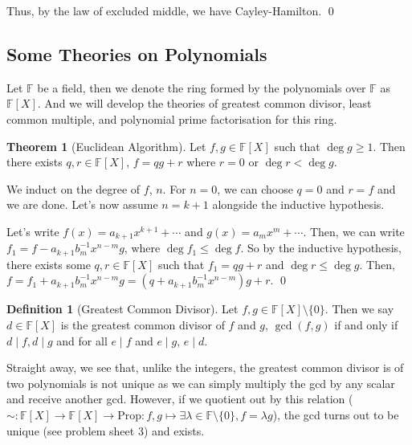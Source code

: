 \documentclass[
]{article}
\theoremstyle{definition}
\newtheorem{theorem}{Theorem}
\theoremstyle{definition}
\newtheorem{definition}{Definition}[section]
\begin{document}
Thus, by the law of excluded middle, we have Cayley-Hamilton. \qed

\hypertarget{some-theories-on-polynomials}{%
\subsection{Some Theories on
Polynomials}\label{some-theories-on-polynomials}}

Let \(\mathbb{F}\) be a field, then we denote the ring formed by the
polynomials over \(\mathbb{F}\) as \(\mathbb{F}[X]\). And we will
develop the theories of greatest common divisor, least common multiple,
and polynomial prime factorisation for this ring.

\begin{theorem}[Euclidean Algorithm]
  Let \(f, g \in \mathbb{F}[X]\) such that \(\deg g \ge 1\). Then there 
  exists \(q, r \in \mathbb{F}[X]\), \(f = q g + r\) where \(r = 0\) or 
  \(\deg r < \deg g\).
\end{theorem}
\proof

We induct on the degree of \(f\), \(n\). For \(n = 0\), we can choose
\(q = 0\) and \(r = f\) and we are done. Let's now assume \(n = k + 1\)
alongside the inductive hypothesis.

Let's write \(f(x) = a_{k + 1}x^{k + 1} + \cdots\) and
\(g(x) = a_m x^m + \cdots\). Then, we can write
\(f_1 = f - a_{k + 1} b_m^{-1} x^{n - m} g\), where
\(\deg f_1 \le \deg f\). So by the inductive hypothesis, there exists
some \(q, r \in \mathbb{F}[X]\) such that \(f_1 = q g + r\) and
\(\deg r \le \deg g\). Then,
\(f = f_1 + a_{k + 1} b_m^{-1} x^{n - m} g  = (q + a_{k + 1} b_m^{-1} x^{n - m}) g + r\).
\qed

\begin{definition}[Greatest Common Divisor]
  Let \(f, g \in \mathbb{F}[X] \setminus \{0\}\). Then we say \(d \in \mathbb{F}[X]\) 
  is the greatest common divisor of \(f\) and \(g\), \(\gcd(f, g)\) if and only 
  if \(d \mid f, d \mid g\) and for all \(e \mid f\) and \(e \mid g\), \(e \mid d\). 
\end{definition}

Straight away, we see that, unlike the integers, the greatest common
divisor is of two polynomials is not unique as we can simply multiply
the gcd by any scalar and receive another gcd. However, if we quotient
out by this relation
(\(\sim : \mathbb{F}[X] \to \mathbb{F}[X] \to \text{Prop} : f, g \mapsto \exists \lambda \in \mathbb{F} \setminus \{0\}, f = \lambda g\)),
the gcd turns out to be unique (see problem sheet 3) and exists.
\end{document}
